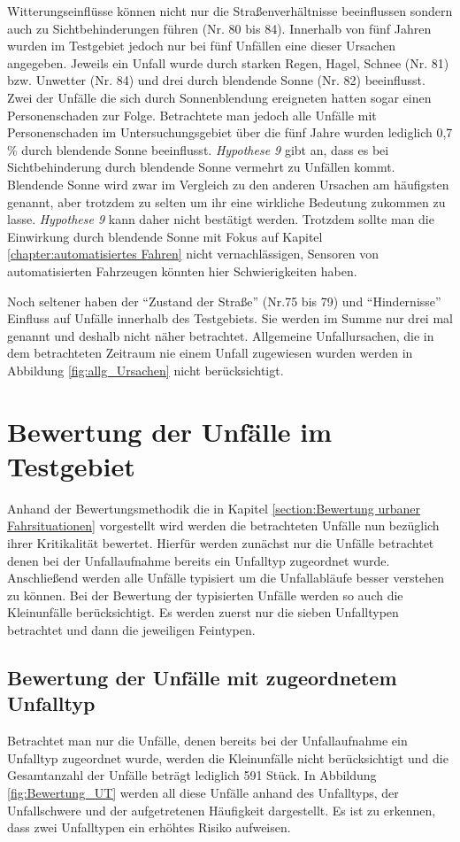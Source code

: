 Witterungseinflüsse können nicht nur die Straßenverhältnisse beeinflussen sondern auch zu Sichtbehinderungen führen (Nr. 80 bis 84). Innerhalb von fünf Jahren wurden im Testgebiet jedoch nur bei fünf Unfällen eine dieser Ursachen angegeben. Jeweils ein Unfall wurde durch starken Regen, Hagel, Schnee (Nr. 81) bzw. Unwetter (Nr. 84) und drei durch blendende Sonne (Nr. 82) beeinflusst. Zwei der Unfälle die sich durch Sonnenblendung ereigneten hatten sogar einen Personenschaden zur Folge. Betrachtete man jedoch alle Unfälle mit Personenschaden im Untersuchungsgebiet über die fünf Jahre wurden lediglich 0,7 \% durch blendende Sonne beeinflusst. \textit{Hypothese 9} gibt an, dass es bei Sichtbehinderung durch blendende Sonne vermehrt zu Unfällen kommt. Blendende Sonne wird zwar im Vergleich zu den anderen Ursachen am häufigsten genannt, aber trotzdem zu selten um ihr eine wirkliche Bedeutung zukommen zu lasse. \textit{Hypothese 9} kann daher nicht bestätigt werden. %
Trotzdem sollte man die Einwirkung durch blendende Sonne mit Fokus auf Kapitel \ref{chapter:automatisiertes Fahren} nicht vernachlässigen, Sensoren von automatisierten Fahrzeugen könnten hier Schwierigkeiten haben.
 
Noch seltener haben der \enquote{Zustand der Straße} (Nr.75 bis 79) und \enquote{Hindernisse} Einfluss auf Unfälle innerhalb des Testgebiets. Sie werden im Summe nur drei mal genannt und deshalb nicht näher betrachtet. Allgemeine Unfallursachen, die in dem betrachteten Zeitraum nie einem Unfall zugewiesen wurden werden in Abbildung \ref{fig:allg_Ursachen} nicht berücksichtigt.


\section{Bewertung der Unfälle im Testgebiet}
Anhand der Bewertungsmethodik die in Kapitel \ref{section:Bewertung urbaner Fahrsituationen} vorgestellt wird werden die betrachteten Unfälle nun bezüglich ihrer Kritikalität bewertet. Hierfür werden zunächst nur die Unfälle betrachtet denen bei der Unfallaufnahme bereits ein Unfalltyp zugeordnet wurde. Anschließend werden alle Unfälle typisiert um die Unfallabläufe besser verstehen zu können. Bei der Bewertung der typisierten Unfälle werden so auch die Kleinunfälle berücksichtigt. Es werden zuerst nur die sieben Unfalltypen betrachtet und dann die jeweiligen Feintypen.

\subsection{Bewertung der Unfälle mit zugeordnetem Unfalltyp}
Betrachtet man nur die Unfälle, denen bereits bei der Unfallaufnahme ein Unfalltyp zugeordnet wurde, werden die Kleinunfälle nicht berücksichtigt und die Gesamtanzahl der Unfälle beträgt lediglich 591 Stück. In Abbildung \ref{fig:Bewertung_UT} werden all diese Unfälle anhand des Unfalltyps, der Unfallschwere und der aufgetretenen Häufigkeit dargestellt. Es ist zu erkennen, dass zwei Unfalltypen ein erhöhtes Risiko aufweisen.

